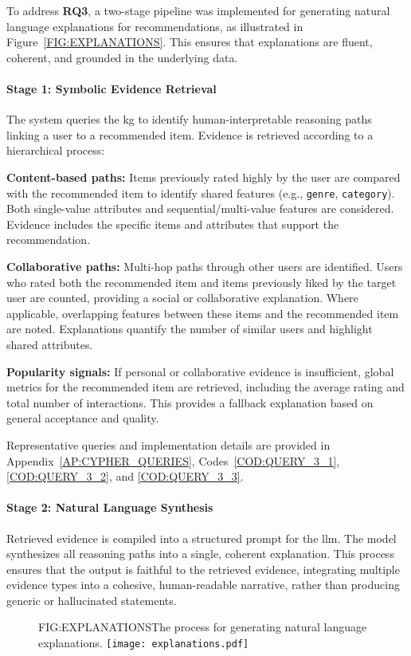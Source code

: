 To address \textbf{RQ3}, a two-stage pipeline was implemented for generating natural language explanations for recommendations, as illustrated in Figure~\ref{FIG:EXPLANATIONS}. This ensures that explanations are fluent, coherent, and grounded in the underlying data.

\paragraph{Stage 1: Symbolic Evidence Retrieval}
The system queries the \ac{kg} to identify human-interpretable reasoning paths linking a user to a recommended item. Evidence is retrieved according to a hierarchical process:
\begin{compactitem}[\textbullet]
    \item \textbf{Content-based paths:} Items previously rated highly by the user are compared with the recommended item to identify shared features (e.g., \texttt{genre}, \texttt{category}). Both single-value attributes and sequential/multi-value features are considered. Evidence includes the specific items and attributes that support the recommendation.
    \item \textbf{Collaborative paths:} Multi-hop paths through other users are identified. Users who rated both the recommended item and items previously liked by the target user are counted, providing a social or collaborative explanation. Where applicable, overlapping features between these items and the recommended item are noted. Explanations quantify the number of similar users and highlight shared attributes.
    \item \textbf{Popularity signals:} If personal or collaborative evidence is insufficient, global metrics for the recommended item are retrieved, including the average rating and total number of interactions. This provides a fallback explanation based on general acceptance and quality.
\end{compactitem}

Representative queries and implementation details are provided in Appendix~\ref{AP:CYPHER_QUERIES}, Codes~\ref{COD:QUERY_3_1}, \ref{COD:QUERY_3_2}, and \ref{COD:QUERY_3_3}.

\paragraph{Stage 2: Natural Language Synthesis} Retrieved evidence is compiled into a structured prompt for the \ac{llm}. The model synthesizes all reasoning paths into a single, coherent explanation. This process ensures that the output is faithful to the retrieved evidence, integrating multiple evidence types into a cohesive, human-readable narrative, rather than producing generic or hallucinated statements.

\begin{figure}[Explanations Generation Process]{FIG:EXPLANATIONS}{The process for generating natural language explanations.}
    \texttt{[image: explanations.pdf]}
\end{figure}